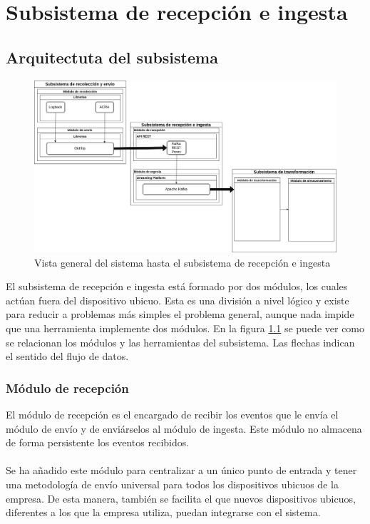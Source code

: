 \chapter{Subsistema de recepción e ingesta}

\section{Arquitectuta del subsistema}

\begin{figure}[!htb]
	\includegraphics[width=\linewidth]{Moduloss-subrecing.png}
	\caption{Vista general del sistema hasta el subsistema de recepción e ingesta}
	\label{fig:subrecing}
\end{figure}

El subsistema de recepción e ingesta está formado por dos módulos, los cuales actúan fuera del dispositivo ubicuo. Esta es una división a nivel lógico y existe para reducir a problemas más simples el problema general, aunque nada impide que una herramienta implemente dos módulos. En la figura \ref{fig:subrecing} se puede ver como se relacionan los módulos y las herramientas del subsistema. Las flechas indican el sentido del flujo de datos.

\subsection{Módulo de recepción}

El módulo de recepción es el encargado de recibir los eventos que le envía el módulo de envío y de enviárselos al módulo de ingesta. Este módulo no almacena de forma persistente los eventos recibidos.
\\\\
Se ha añadido este módulo para centralizar a un único punto de entrada y tener una metodología de envío universal para todos los dispositivos ubicuos de la empresa. De esta manera, también se facilita el que nuevos dispositivos ubicuos, diferentes a los que la empresa utiliza, puedan integrarse con el sistema.

